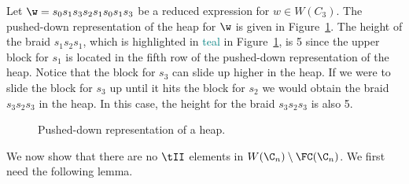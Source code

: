 \begin{example}
Let $\w=s_0s_1s_3s_2s_1s_0s_1s_3$ be a reduced expression for $w \in W(C_3)$. The pushed-down representation of the heap for $\w$ is given in Figure~\ref{fig:pusheddownheap}. The height of the braid $s_1s_2s_1$, which is highlighted in \textcolor{teal}{teal} in Figure~\ref{fig:pusheddownheap}, is 5 since the upper block for $s_1$ is located in the fifth row of the pushed-down representation of the heap. Notice that the block for $s_3$ can slide up higher in the heap. If we were to slide the block for $s_3$ up until it hits the block for $s_2$ we would obtain the braid $s_3s_2s_3$ in the heap. In this case, the height for the braid $s_3s_2s_3$ is also 5.   

\begin{figure}[h!] \centering
{}	
\caption{Pushed-down representation of a heap.}\label{fig:pusheddownheap}
\end{figure}
\end{example}

We now show that there are no $\tII$ elements in $W(\C_n) \setminus \FC(\C_n)$. We first need the following lemma.

